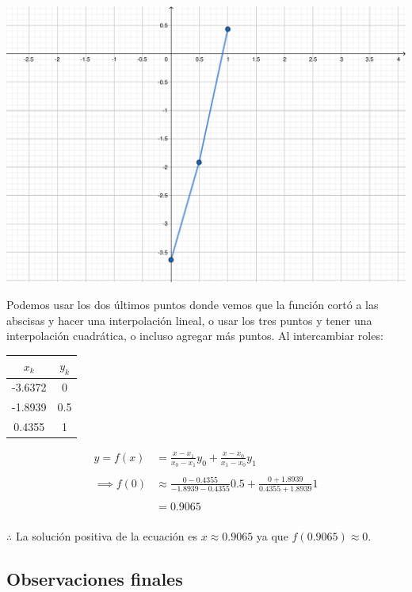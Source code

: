 \documentclass[openany]{book}
\begin{document}
\begin{center}\includegraphics[width=0.75\linewidth]{Plots/U4/lagr_ecuacion1} \end{center}

Podemos usar los dos últimos puntos donde vemos que la función cortó a las abscisas y hacer una interpolación lineal, o usar los tres puntos y tener una interpolación cuadrática, o incluso agregar más puntos. Al intercambiar roles:

\begin{longtable}[]{@{}cc@{}}
\toprule
\(x_k\) & \(y_k\)\tabularnewline
\midrule
\endhead
-3.6372 & 0\tabularnewline
-1.8939 & 0.5\tabularnewline
0.4355 & 1\tabularnewline
\bottomrule
\end{longtable}

\[
\begin{split}
y = f(x) &= \frac{x - x_1}{x_0 - x_1} y_0 + \frac{x - x_0}{x_1 - x_0} y_1 \\ \\
\implies f(0) &\approx \frac{0-0.4355}{-1.8939-0.4355} 0.5 + \frac{0+1.8939}{0.4355+1.8939} 1 \\ \\
&= 0.9065 \\
\end{split}
\]

\(\therefore\) La solución positiva de la ecuación es \(x \approx 0.9065\) ya que \(f(0.9065) \approx 0\).

\hypertarget{observaciones-finales}{%
\subsection{Observaciones finales}\label{observaciones-finales}}
\end{document}
